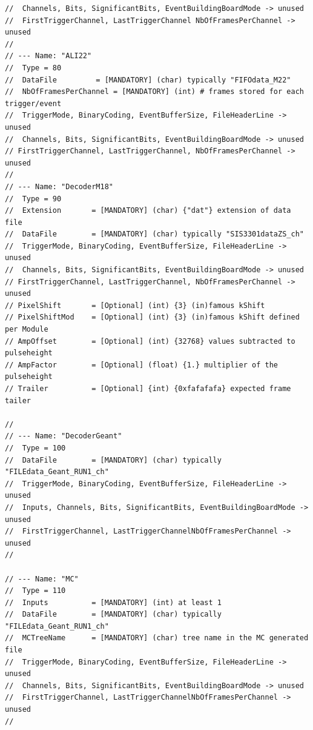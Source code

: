 \documentclass[a4paper, 12pt, twoside]{article}
\begin{document}
\begin{verbatim}
//  Channels, Bits, SignificantBits, EventBuildingBoardMode -> unused
//  FirstTriggerChannel, LastTriggerChannel NbOfFramesPerChannel -> unused
//
// --- Name: "ALI22"
//  Type = 80
//  DataFile         = [MANDATORY] (char) typically "FIFOdata_M22"
//  NbOfFramesPerChannel = [MANDATORY] (int) # frames stored for each trigger/event
//  TriggerMode, BinaryCoding, EventBufferSize, FileHeaderLine -> unused
//  Channels, Bits, SignificantBits, EventBuildingBoardMode -> unused
// FirstTriggerChannel, LastTriggerChannel, NbOfFramesPerChannel -> unused
//
// --- Name: "DecoderM18"
//  Type = 90
//  Extension       = [MANDATORY] (char) {"dat"} extension of data file
//  DataFile        = [MANDATORY] (char) typically "SIS3301dataZS_ch"
//  TriggerMode, BinaryCoding, EventBufferSize, FileHeaderLine -> unused
//  Channels, Bits, SignificantBits, EventBuildingBoardMode -> unused
// FirstTriggerChannel, LastTriggerChannel, NbOfFramesPerChannel -> unused
// PixelShift       = [Optional] (int) {3} (in)famous kShift
// PixelShiftMod    = [Optional] (int) {3} (in)famous kShift defined per Module
// AmpOffset        = [Optional] (int) {32768} values subtracted to pulseheight
// AmpFactor        = [Optional] (float) {1.} multiplier of the pulseheight
// Trailer          = [Optional] {int) {0xfafafafa} expected frame tailer

//
// --- Name: "DecoderGeant"
//  Type = 100
//  DataFile        = [MANDATORY] (char) typically "FILEdata_Geant_RUN1_ch"
//  TriggerMode, BinaryCoding, EventBufferSize, FileHeaderLine -> unused
//  Inputs, Channels, Bits, SignificantBits, EventBuildingBoardMode -> unused
//  FirstTriggerChannel, LastTriggerChannelNbOfFramesPerChannel -> unused
//

// --- Name: "MC"
//  Type = 110
//  Inputs          = [MANDATORY] (int) at least 1
//  DataFile        = [MANDATORY] (char) typically "FILEdata_Geant_RUN1_ch"
//  MCTreeName      = [MANDATORY] (char) tree name in the MC generated file
//  TriggerMode, BinaryCoding, EventBufferSize, FileHeaderLine -> unused
//  Channels, Bits, SignificantBits, EventBuildingBoardMode -> unused
//  FirstTriggerChannel, LastTriggerChannelNbOfFramesPerChannel -> unused
//



\end{verbatim}
\end{document}
